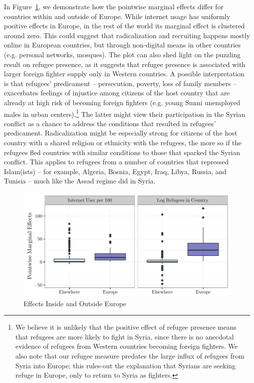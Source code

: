 \documentclass[12pt]{article}
\begin{document}
In Figure~\ref{fig:hetplot1}, we demonstrate how the pointwise marginal effects differ for countries within and outside of Europe. While internet usage has uniformly positive effects in Europe, in the rest of the world its marginal effect is clustered around zero. This could suggest that radicalization and recruiting happens mostly online in European countries, but through non-digital means in other countries (e.g. personal networks, mosques). The plot can also shed light on the puzzling result on refugee presence, as it suggests that refugee presence is associated with larger foreign fighter supply only in Western countries. A possible interpretation is that refugees' predicament -- persecution, poverty, loss of family members -- exacerbates feelings of injustice among citizens of the host country that are already at high risk of becoming foreign fighters (e.g. young Sunni unemployed males in urban centers).\footnote{We believe it is unlikely that the positive effect of refugee presence means that refugees are more likely to fight in Syria, since there is no anecdotal evidence of refugees from Western countries becoming foreign fighters. We also note that our refugee measure predates the large influx of refugees from Syria into Europe; this rules-out the explanation that Syrians are seeking refuge in Europe, only to return to Syria as fighters.} The latter might view their participation in the Syrian conflict as a chance to address the conditions that resulted in refugees' predicament. Radicalization might be especially strong for citizens of the host country with a shared religion or ethnicity with the refugees, the more so if the refugees fled countries with similar conditions to those that sparked the Syrian conflict. This applies to refugees from a number of countries that repressed Islam(ists) -- for example, Algeria, Bosnia, Egypt, Iraq, Libya, Russia, and Tunisia  -- much like the Assad regime did in Syria.	 \\

\begin{figure}[!h]
	\centering
	\includegraphics[scale=.85]{tabs_figs/hetplot1.pdf}
	\caption{Effects Inside and Outside Europe}	\label{fig:hetplot1} 
\end{figure}
\end{document}
